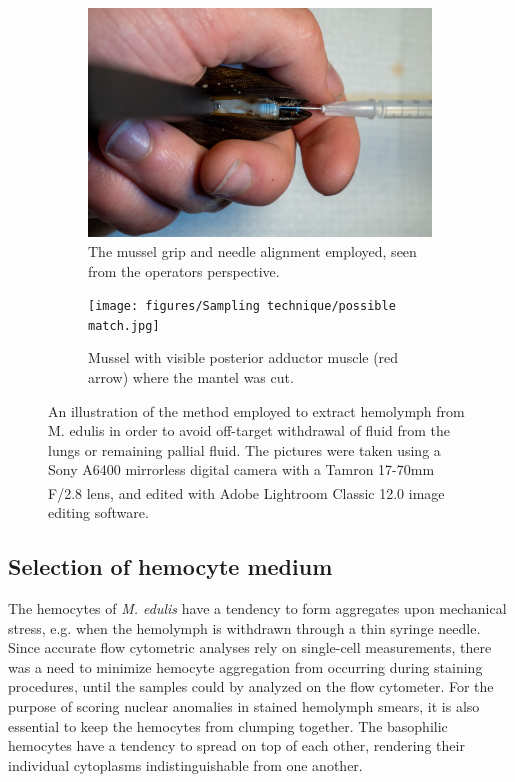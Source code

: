 \begin{figure}[t]
\begin{subfigure}[b]{.45\textwidth}
        \centering
        \includegraphics[width=\textwidth]{figures/Sampling technique/hands colors centered.jpg}
        \caption{The mussel grip and needle alignment employed, seen from the operators perspective. }
        \label{sfig:c}
    \end{subfigure}
    \hfill
    \begin{subfigure}[b]{.45\textwidth}
        \centering
        \texttt{[image: figures/Sampling technique/possible match.jpg]}
        \caption{Mussel with visible posterior adductor muscle (red arrow) where the mantel was cut.}
        \label{sfig:d}
    \end{subfigure}
    \caption{An illustration of the method employed to extract hemolymph from M. edulis in order to avoid off-target withdrawal of fluid from the lungs or remaining pallial fluid. The pictures were taken using a Sony A6400 mirrorless digital camera with a Tamron 17-70mm F/2.8 lens, and edited with Adobe\textsuperscript{\textregistered} Lightroom Classic 12.0 image editing software.}
    \label{fig:Hemolymph_sampling_illustration}
\end{figure}

\subsection{Selection of hemocyte medium}
The hemocytes of \emph{M. edulis} have a tendency to form aggregates upon mechanical stress, e.g. when the hemolymph is withdrawn through a thin syringe needle. Since accurate flow cytometric analyses rely on single-cell measurements, there was a need to minimize hemocyte aggregation from occurring during staining procedures, until the samples could by analyzed on the flow cytometer. For the purpose of scoring nuclear anomalies in stained hemolymph smears, it is also essential to keep the hemocytes from clumping together. The basophilic hemocytes have a tendency to spread on top of each other, rendering their individual cytoplasms indistinguishable from one another.

